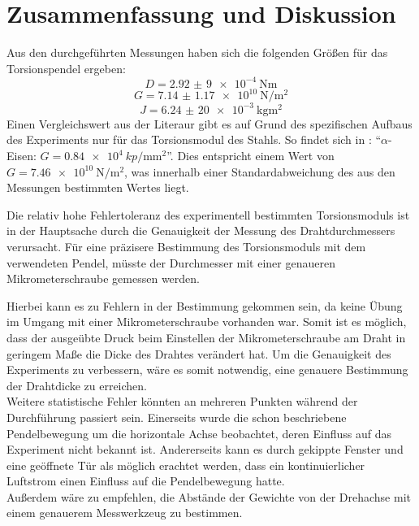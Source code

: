 \section{Zusammenfassung und Diskussion}
Aus den durchgeführten Messungen haben sich die folgenden Größen für das Torsionspendel ergeben:
\begin{equation*}
    D = \qty{2,92(9)e-4}{\newton\meter}
\end{equation*}
\begin{equation*}
    G = \qty{7.14(117)e10}{\newton\per\square\meter}
\end{equation*}
\begin{equation*}
    J = \qty{6,24(20)e-3}{\kilo\gram\meter\squared}
\end{equation*}
Einen Vergleichswert aus der Literaur gibt es auf Grund des spezifischen Aufbaus des Experiments nur für das Torsionsmodul des Stahls. So findet sich in \cite{Walcher2004}: "`$\alpha$-Eisen: $G = \qty{0,84e4}{kp\per\milli\meter\squared}$"'. Dies entspricht einem Wert von $G = \qty{7.46e10}{\newton\per\square\meter}$, was innerhalb einer Standardabweichung des aus den Messungen bestimmten Wertes liegt.

Die relativ hohe Fehlertoleranz des experimentell bestimmten Torsionsmoduls ist in der Hauptsache durch die Genauigkeit der Messung des Drahtdurchmessers verursacht.
Für eine präzisere Bestimmung des Torsionsmoduls mit dem verwendeten Pendel, müsste der Durchmesser mit einer genaueren Mikrometerschraube gemessen werden.

Hierbei kann es zu Fehlern in der Bestimmung gekommen sein, da keine Übung im Umgang mit einer Mikrometerschraube vorhanden war. Somit ist es möglich, dass der ausgeübte Druck beim Einstellen der Mikrometerschraube am Draht in geringem Maße die Dicke des Drahtes verändert hat. Um die Genauigkeit des Experiments zu verbessern, wäre es somit notwendig, eine genauere Bestimmung der Drahtdicke zu erreichen. \\
Weitere statistische Fehler könnten an mehreren Punkten während der Durchführung passiert sein. Einerseits wurde die schon beschriebene Pendelbewegung um die horizontale Achse beobachtet, deren Einfluss auf das Experiment nicht bekannt ist. Andererseits kann es durch gekippte Fenster und eine geöffnete Tür als möglich erachtet werden, dass ein kontinuierlicher Luftstrom einen Einfluss auf die Pendelbewegung hatte.\\
Außerdem wäre zu empfehlen, die Abstände der Gewichte von der Drehachse mit einem genauerem Messwerkzeug zu bestimmen.

